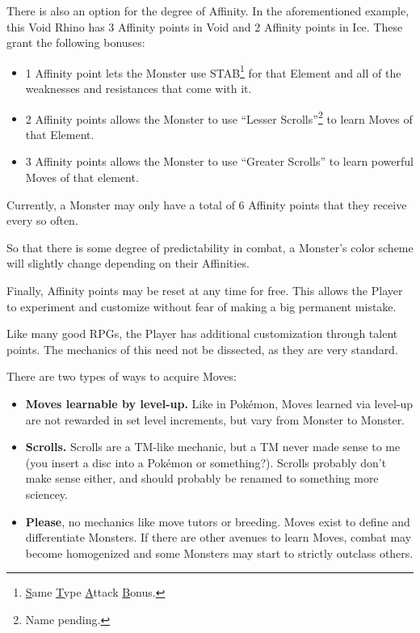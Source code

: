 
There is also an option for the degree of Affinity. In the aforementioned example, this Void Rhino has 3 Affinity points in Void and 2 Affinity points in Ice. These grant the following bonuses:

\begin{itemize}
	\item{1 Affinity point lets the Monster use STAB\footnote{\ul{S}ame \ul{T}ype \ul{A}ttack \ul{B}onus.} for that Element and all of the weaknesses and resistances that come with it.}
	\item{2 Affinity points allows the Monster to use ``Lesser Scrolls''\footnote{Name pending.} to learn Moves of that Element.}
	\item{3 Affinity points allows the Monster to use ``Greater Scrolls'' to learn powerful Moves of that element.}
\end{itemize}

Currently, a Monster may only have a total of 6 Affinity points that they receive every so often. 

So that there is some degree of predictability in combat, a Monster's color scheme will slightly change depending on their Affinities. 

Finally, Affinity points may be reset at any time for free. This allows the Player to experiment and customize without fear of making a big permanent mistake.

Like many good RPGs, the Player has additional customization through talent points. The mechanics of this need not be dissected, as they are very standard. 	

There are two types of ways to acquire Moves:
\begin{itemize}
	\item{\textbf{Moves learnable by level-up.} Like in Pok\'{e}mon, Moves learned via level-up are not rewarded in set level increments, but vary from Monster to Monster.}
	\item{\textbf{Scrolls.} Scrolls are a TM-like mechanic, but a TM never made sense to me (you insert a disc into a Pok\'{e}mon or something?). Scrolls probably don't make sense either, and should probably be renamed to something more sciencey.}
	\item{\textbf{Please}, no mechanics like move tutors or breeding. Moves exist to define and differentiate Monsters. If there are other avenues to learn Moves, combat may become homogenized and some Monsters may start to strictly outclass others.}
\end{itemize}

